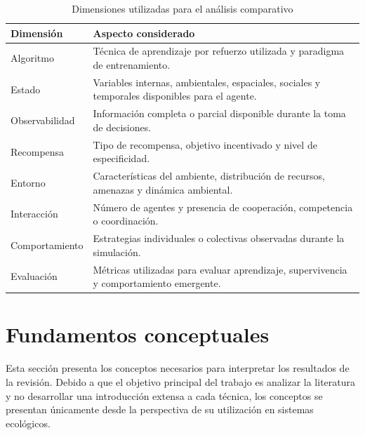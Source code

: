 \documentclass[conference]{IEEEtran}
\begin{document}
\begin{table}[H]
\centering
\caption{Dimensiones utilizadas para el análisis comparativo}
\label{tab:dimensiones}
\small
\begin{tabular}{p{3.5cm} p{4.5cm}}
\toprule
\textbf{Dimensión} & \textbf{Aspecto considerado} \\
\midrule

Algoritmo &
Técnica de aprendizaje por refuerzo utilizada y paradigma de
entrenamiento. \\

Estado &
Variables internas, ambientales, espaciales, sociales y temporales
disponibles para el agente. \\

Observabilidad &
Información completa o parcial disponible durante la toma de
decisiones. \\

Recompensa &
Tipo de recompensa, objetivo incentivado y nivel de especificidad. \\

Entorno &
Características del ambiente, distribución de recursos, amenazas y
dinámica ambiental. \\

Interacción &
Número de agentes y presencia de cooperación, competencia o
coordinación. \\

Comportamiento &
Estrategias individuales o colectivas observadas durante la simulación. \\

Evaluación &
Métricas utilizadas para evaluar aprendizaje, supervivencia y
comportamiento emergente. \\

\bottomrule
\end{tabular}
\end{table}


\section{Fundamentos conceptuales}

Esta sección presenta los conceptos necesarios para interpretar los
resultados de la revisión. Debido a que el objetivo principal del trabajo
es analizar la literatura y no desarrollar una introducción extensa a
cada técnica, los conceptos se presentan únicamente desde la perspectiva
de su utilización en sistemas ecológicos.
\end{document}
